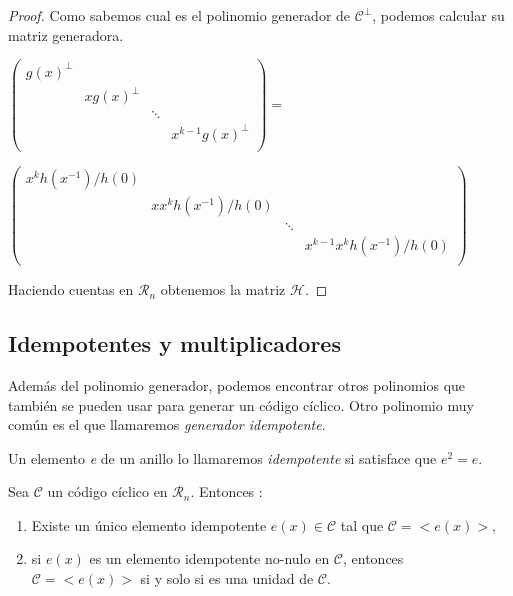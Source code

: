 \begin{proof}
Como sabemos cual es el polinomio generador de $\mathcal{C}^\perp$, podemos calcular su matriz generadora.

$\begin{pmatrix}
			g(x)^\perp &  &  &   \\
			 & xg(x)^\perp  &  &   \\
			 &  & \ddots &   \\
			 &  &  & x^{k-1}g(x)^\perp  \\
	\end{pmatrix} = $
	
	$\begin{pmatrix}
			x^kh(x^{-1})/h(0) &  &  &   \\
			 & xx^kh(x^{-1})/h(0)  &  &   \\
			 &  & \ddots &   \\
			 &  &  & x^{k-1}x^kh(x^{-1})/h(0)  \\
	\end{pmatrix}$ 
	
Haciendo cuentas en $\mathcal{R}_n$ obtenemos la matriz $\mathcal{H}$. 
\end{proof}


\subsection{Idempotentes y multiplicadores}

Además del polinomio generador, podemos encontrar otros polinomios que también se pueden usar para generar un código cíclico. Otro polinomio muy común es el que llamaremos \textit{generador idempotente}.

\begin{definition}
Un elemento \textit{e} de un anillo lo llamaremos \textit{idempotente} si satisface que $e^2=e$.
\end{definition}

\begin{theorem}
Sea $\mathcal{C}$ un código cíclico en $\mathcal{R}_n$. Entonces :
\begin{enumerate}
	\item Existe un único elemento idempotente $e(x) \in \mathcal{C}$ tal que $\mathcal{C} = < e(x) >$,
	\item si $e(x)$ es un elemento idempotente no-nulo en $\mathcal{C}$, entonces $\mathcal{C} = < e(x) >$ si y solo si es una unidad de $\mathcal{C}$.
\end{enumerate}
\end{theorem} 

